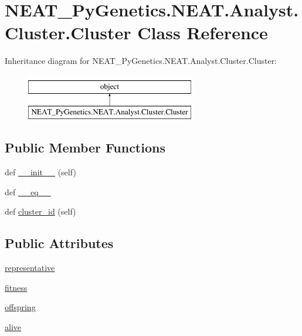 \hypertarget{classNEAT__PyGenetics_1_1NEAT_1_1Analyst_1_1Cluster_1_1Cluster}{}\section{N\+E\+A\+T\+\_\+\+Py\+Genetics.\+N\+E\+A\+T.\+Analyst.\+Cluster.\+Cluster Class Reference}
\label{classNEAT__PyGenetics_1_1NEAT_1_1Analyst_1_1Cluster_1_1Cluster}
Inheritance diagram for N\+E\+A\+T\+\_\+\+Py\+Genetics.\+N\+E\+A\+T.\+Analyst.\+Cluster.\+Cluster\+:\begin{figure}[H]
\begin{center}
\leavevmode
\includegraphics[height=2.000000cm]{classNEAT__PyGenetics_1_1NEAT_1_1Analyst_1_1Cluster_1_1Cluster}
\end{center}
\end{figure}
\subsection*{Public Member Functions}
\begin{DoxyCompactItemize}
\item 
def \hyperlink{classNEAT__PyGenetics_1_1NEAT_1_1Analyst_1_1Cluster_1_1Cluster_a12ebc01de1535941e1af477dddaedbe9}{\+\_\+\+\_\+init\+\_\+\+\_\+} (self)
\item 
def \hyperlink{classNEAT__PyGenetics_1_1NEAT_1_1Analyst_1_1Cluster_1_1Cluster_a85d2dfa24ff6846be17920a77987ece5}{\+\_\+\+\_\+eq\+\_\+\+\_\+}
\item 
def \hyperlink{classNEAT__PyGenetics_1_1NEAT_1_1Analyst_1_1Cluster_1_1Cluster_a691632bc1747f486a4f1c8fe3ee02265}{cluster\+\_\+id} (self)
\end{DoxyCompactItemize}
\subsection*{Public Attributes}
\begin{DoxyCompactItemize}
\item 
\hyperlink{classNEAT__PyGenetics_1_1NEAT_1_1Analyst_1_1Cluster_1_1Cluster_a6d98b217b836b08679f9b20f9459f2ba}{representative}
\item 
\hyperlink{classNEAT__PyGenetics_1_1NEAT_1_1Analyst_1_1Cluster_1_1Cluster_a1c956f56f9f8e92391eb6c8912d8cd8a}{fitness}
\item 
\hyperlink{classNEAT__PyGenetics_1_1NEAT_1_1Analyst_1_1Cluster_1_1Cluster_a29316a5b5546bea6c97896e814ce084e}{offspring}
\item 
\hyperlink{classNEAT__PyGenetics_1_1NEAT_1_1Analyst_1_1Cluster_1_1Cluster_a9d814ccf011d42ab14bdade4be3e1fdb}{alive}
\end{DoxyCompactItemize}


